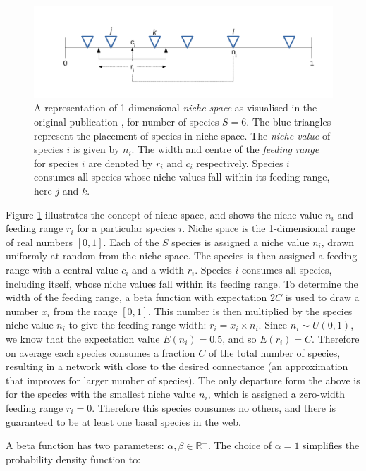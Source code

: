 \begin{figure}
	\centering
	\includegraphics[width=\textwidth]{"diagrams/niche_space"}
	\caption[Niche space.]{A representation of 1-dimensional \emph{niche space} as visualised in the original publication \cite{williams2000simple}, for number of species $S=6$. The blue triangles represent the placement of species in niche space. The \emph{niche value} of species $i$ is given by $n_i$. The width and centre of the \emph{feeding range} for species $i$ are denoted by $r_i$ and $c_i$ respectively. Species $i$ consumes all species whose niche values fall within its feeding range, here $j$ and $k$.}
	\label{fig:niche_model}
\end{figure}


Figure \ref{fig:niche_model} illustrates the concept of niche space, and shows the niche value $n_i$ and feeding range $r_i$ for a particular species $i$. Niche space is the 1-dimensional range of real numbers $[0,1]$. Each of the $S$ species is assigned a niche value $n_i$, drawn uniformly at random from the niche space. The species is then assigned a feeding range with a central value $c_i$ and a width $r_i$. Species $i$ consumes all species, including itself, whose niche values fall within its feeding range. To determine the width of the feeding range, a beta function with expectation $2C$ is used to draw a number $x_i$ from the range $[0,1]$. This number is then multiplied by the species niche value $n_i$ to give the feeding range width: $r_i = x_i \times n_i$.  Since $n_i \sim U(0,1)$, we know that the expectation value $E(n_i) = 0.5$, and so $E(r_i) = C$. Therefore on average each species consumes a fraction $C$ of the total number of species, resulting in a network with close to the desired connectance (an approximation that improves for larger number of species). The only departure form the above is for the species with the smallest niche value $n_i$, which is assigned a zero-width feeding range $r_i = 0$. Therefore this species consumes no others, and there is guaranteed to be at least one basal species in the web.

A beta function has two parameters: $\alpha, \beta \in \mathbb{R^+}$. The choice of $\alpha = 1$ simplifies the probability density function to:


